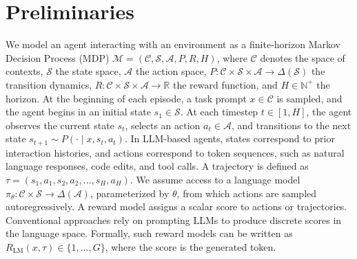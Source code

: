 \section{Preliminaries}
We model an agent interacting with an environment as a finite-horizon Markov Decision Process (MDP) $\mathcal{M} = (\mathcal{C}, \mathcal{S}, \mathcal{A}, P, R, H)$, where $\mathcal{C}$ denotes the space of contexts, $\mathcal{S}$ the state space, $\mathcal{A}$ the action space, $P : \mathcal{C} \times \mathcal{S} \times \mathcal{A} \rightarrow \Delta(\mathcal{S})$ the transition dynamics, $R : \mathcal{C} \times \mathcal{S} \times \mathcal{A} \rightarrow \mathbb{R}$ the reward function, and $H \in \mathbb{N}^+$ the horizon. At the beginning of each episode, a task prompt $x \in \mathcal{C}$ is sampled, and the agent begins in an initial state $s_1 \in \mathcal{S}$. At each timestep $t \in [1, H]$, the agent observes the current state $s_t$, selects an action $a_t \in \mathcal{A}$, and transitions to the next state $s_{t+1} \sim P(\cdot \mid x, s_t, a_t)$. In LLM-based agents, states correspond to prior interaction histories, and actions correspond to token sequences, such as natural language responses, code edits, and tool calls. A trajectory is defined as $\tau = (s_1, a_1, s_2, a_2, \dots, s_H, a_H)$. We assume access to a language model $\pi_\theta : \mathcal{C} \times \mathcal{S} \rightarrow \Delta(\mathcal{A})$, parameterized by $\theta$, from which actions are sampled autoregressively. A reward model assigns a scalar score to actions or trajectories. Conventional approaches rely on prompting LLMs to produce discrete scores in the language space. Formally, such reward models can be written as $R_{\text{LM}}(x, \tau) \in \{1, \dots, G\}$, where the score is the generated token.

